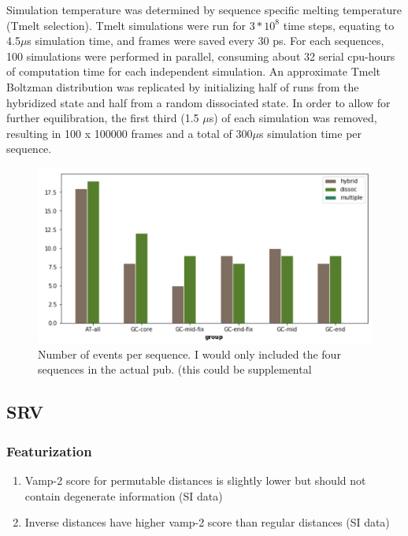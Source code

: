 \documentclass[journal=jpcbfk,manuscript=article]{achemso}
\begin{document}
Simulation temperature was determined by sequence specific melting temperature (Tmelt selection). Tmelt simulations were run for $3*10^{8}$ time steps, equating to 4.5$\mu$s simulation time, and frames were saved every 30 ps. For each sequences, 100 simulations were performed in parallel, consuming about 32 serial cpu-hours of computation time for each independent simulation. An approximate Tmelt Boltzman distribution was replicated by initializing half of runs from the hybridized state and half from a random dissociated state. In order to allow for further equilibration, the first third (1.5 $\mu$s) of each simulation was removed, resulting in 100 x 100000 frames and a total of 300$\mu$s simulation time per sequence.

\begin{figure}[ht!]
	\begin{center}
        \includegraphics[width=\textwidth]{Figs/skeleton/n_events.PNG}
        \caption{Number of events per sequence. I would only included the four sequences in the actual pub. (this could be supplemental}
        \label{fig:n_events}
	\end{center}
\end{figure}   

\subsection{\label{sec:methods}SRV}
\subsubsection{\label{sec:methods}Featurization}

\begin{enumerate}
	\item Vamp-2 score for permutable distances is slightly lower but should not contain degenerate information (SI data)
	\item Inverse distances have higher vamp-2 score than regular distances (SI data)
\end{enumerate}
\end{document}
